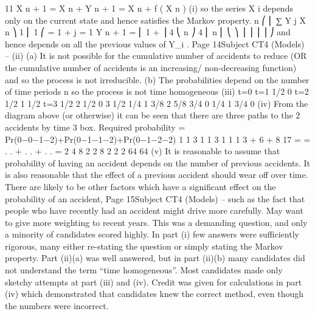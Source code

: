 11
X n + 1 = X n + Y n + 1 = X n + f ( X n )
(i)
so the series X i depends only on the current state and hence satisfies the
Markov property.
n
⎛
⎜ ∑ Y j
X n ⎞ 1 ⎜
1 ⎛
= 1 + j = 1
Y n + 1 = ⎜ 1 +
⎟
4 ⎝
n ⎠ 4 ⎜
n
⎜
⎝
⎞
⎟
⎟
⎟
⎟
⎠
and hence depends on all the previous values of Y_i .
Page 14Subject CT4 (Models) – %
(ii)
(a)
It is not possible for the cumulative number of accidents to reduce
(OR the cumulative number of accidents is an increasing/
non-decreasing function)
and so the process is not irreducible.
(b)
The probabilities depend on the number of time periods n
so the process is not time homogeneous
(iii)
t=0
t=1
1/2
0
t=2
1/2
1
1/2
t=3
1/2
2
1/2
0
3
1/2
1/4
1
3/8
2
5/8
3/4
0
1/4
1
3/4
0
(iv)
From the diagram above (or otherwise) it can be seen that there are
three paths to the 2 accidents by time 3 box.
Required probability
= Pr(0−0−1−2)+Pr(0−1−1−2)+Pr(0−1−2−2)
1 1 3 1 1 3 1 1 1 3 + 6 + 8 17
=
= . . + . . + . . =
2 4 8 2 2 8 2 2 2
64
64
(v)
It is reasonable to assume that probability of having an accident depends on the
number of previous accidents.
It is also reasonable that the effect of a previous accident should wear off over time.
There are likely to be other factors which have a significant effect on the probability
of an accident,
Page 15Subject CT4 (Models) – %
such as the fact that people who have recently had an accident might drive more
carefully.
May want to give more weighting to recent years.
This was a demanding question, and only a minority of candidates scored highly. In part (i)
few answers were sufficiently rigorous, many either re-stating the question or simply stating
the Markov property. Part (ii)(a) was well answered, but in part (ii)(b) many candidates did
not understand the term “time homogeneous”. Most candidates made only sketchy attempts
at part (iii) and (iv). Credit was given for calculations in part (iv) which demonstrated that
candidates knew the correct method, even though the numbers were incorrect.
